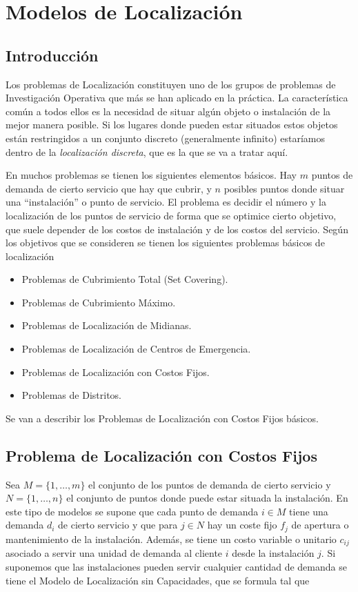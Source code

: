 \section{Modelos de Localización}

\subsection{Introducción}

Los problemas de Localización constituyen uno de los grupos de problemas de Investigación Operativa que más se han aplicado en
la práctica. La característica común a todos ellos es la necesidad de situar algún objeto o instalación de la mejor manera
posible. Si los lugares donde pueden estar situados estos objetos están restringidos a un conjunto discreto (generalmente
infinito) estaríamos dentro de la \textit{localización discreta}, que es la que se va a tratar aquí.

En muchos problemas se tienen los siguientes elementos básicos. Hay $m$ puntos de demanda de cierto servicio que hay que
cubrir, y $n$ posibles puntos donde situar una ``instalación'' o punto de servicio. El problema es decidir el número y la
localización de los puntos de servicio de forma que se optimice cierto objetivo, que suele depender de los costos de
instalación y de los costos del servicio. Según los objetivos que se consideren se tienen los siguientes problemas básicos
de localización

\begin{itemize}
    \item Problemas de Cubrimiento Total (Set Covering).
    \item Problemas de Cubrimiento Máximo.
    \item Problemas de Localización de Midianas.
    \item Problemas de Localización de Centros de Emergencia.
    \item Problemas de Localización con Costos Fijos.
    \item Problemas de Distritos.
\end{itemize}

\noindent Se van a describir los Problemas de Localización con Costos Fijos básicos.

\subsection{Problema de Localización con Costos Fijos}

Sea $M=\{1,\dots,m\}$ el conjunto de los puntos de demanda de cierto servicio y $N=\{1,\dots,n\}$ el conjunto de puntos donde
puede estar situada la instalación. En este tipo de modelos se supone que cada punto de demanda $i\in M$ tiene una demanda
$d_i$ de cierto servicio y que para $j\in N$ hay un coste fijo $f_j$ de apertura o mantenimiento de la instalación. Además,
se tiene un costo variable o unitario $c_{ij}$ asociado a servir una unidad de demanda al cliente $i$ desde la instalación
$j$. Si suponemos que las instalaciones pueden servir cualquier cantidad de demanda se tiene el Modelo de Localización sin
Capacidades, que se formula tal que

